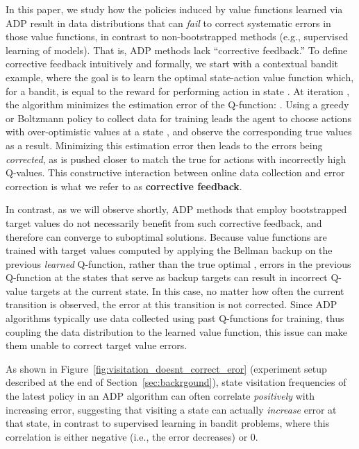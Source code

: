 \documentclass[jmlr]{article}
\begin{document}
 





In this paper, we study how the policies induced by value functions learned via ADP result in data distributions that can \emph{fail} to correct systematic errors in those value functions, in contrast to non-bootstrapped methods (e.g., supervised learning of models).
That is, ADP methods lack ``corrective feedback.'' To define corrective feedback intuitively and formally, we start with a contextual bandit example, where the goal is to learn the optimal state-action value function  which, for a bandit, is equal to the reward  for performing action  in state . At iteration , the algorithm minimizes the estimation error of the Q-function: \mbox{}. Using a greedy or Boltzmann policy  to collect data for training  leads the agent to choose actions  with over-optimistic  values at a state , and observe the corresponding true  values as a result. Minimizing this estimation error then leads to the errors being \emph{corrected}, as  is pushed closer to match the true  for actions  with incorrectly high Q-values. This constructive interaction between online data collection and error correction is what we refer to as \textbf{corrective feedback}.


In contrast, as we will observe shortly, ADP methods that employ bootstrapped target values do not necessarily benefit from such corrective feedback, and therefore can converge to suboptimal solutions. Because value functions are trained with target values computed by applying the Bellman backup on the previous \emph{learned} Q-function, rather than the true optimal , errors in the previous Q-function at the states that serve as backup targets can result in incorrect Q-value targets at the current state. In this case, no matter how often the current transition is observed, the error at this transition is not corrected. 
Since ADP algorithms typically use data collected using past Q-functions for training, thus coupling the data distribution to the learned value function, this issue can make them unable to correct target value errors.

As shown in Figure~\ref{fig:visitation_doesnt_correct_eror} (experiment setup described at the end of Section~\ref{sec:backrgound}), state visitation frequencies of the latest policy in an ADP algorithm can often correlate \emph{positively} with increasing error, suggesting that visiting a state can actually \textit{increase} error at that state, in contrast to supervised learning in bandit problems, where this correlation is either negative (i.e., the error decreases) or 0.
\end{document}
